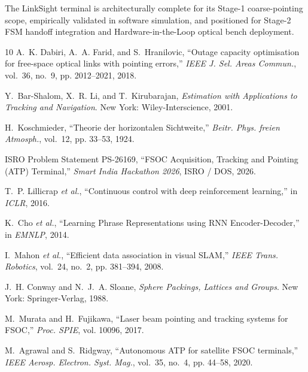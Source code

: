 \documentclass[11pt,a4paper]{article}
\begin{document}
The LinkSight terminal is architecturally complete for its Stage-1 coarse-pointing scope, empirically validated in software simulation, and positioned for Stage-2 FSM handoff integration and Hardware-in-the-Loop optical bench deployment.

\begin{thebibliography}{10}
\small
{}
A.~K. Dabiri, A.~A. Farid, and S.~Hranilovic, ``Outage capacity optimisation for free-space optical links with pointing errors,'' \emph{IEEE J. Sel. Areas Commun.}, vol.~36, no.~9, pp. 2012--2021, 2018.

Y.~Bar-Shalom, X.~R. Li, and T.~Kirubarajan, \emph{Estimation with Applications to Tracking and Navigation}. New York: Wiley-Interscience, 2001.

H.~Koschmieder, ``Theorie der horizontalen Sichtweite,'' \emph{Beitr. Phys. freien Atmosph.}, vol.~12, pp. 33--53, 1924.

ISRO Problem Statement PS-26169, ``FSOC Acquisition, Tracking and Pointing (ATP) Terminal,'' \emph{Smart India Hackathon 2026}, ISRO / DOS, 2026.

T.~P. Lillicrap \emph{et al.}, ``Continuous control with deep reinforcement learning,'' in \emph{ICLR}, 2016.

K.~Cho \emph{et al.}, ``Learning Phrase Representations using RNN Encoder-Decoder,'' in \emph{EMNLP}, 2014.

I.~Mahon \emph{et al.}, ``Efficient data association in visual SLAM,'' \emph{IEEE Trans. Robotics}, vol.~24, no.~2, pp. 381--394, 2008.

J.~H. Conway and N.~J.~A. Sloane, \emph{Sphere Packings, Lattices and Groups}. New York: Springer-Verlag, 1988.

M.~Murata and H.~Fujikawa, ``Laser beam pointing and tracking systems for FSOC,'' \emph{Proc. SPIE}, vol. 10096, 2017.

M.~Agrawal and S.~Ridgway, ``Autonomous ATP for satellite FSOC terminals,'' \emph{IEEE Aerosp. Electron. Syst. Mag.}, vol.~35, no.~4, pp. 44--58, 2020.

\end{thebibliography}
\end{document}
